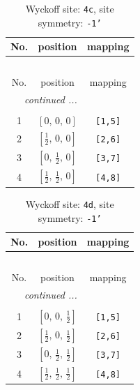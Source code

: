\documentclass[fleqn,8pt]{jsarticle}
\begin{document}
\renewcommand{\arraystretch}{1.2}
\begin{longtable}{ccc}
\caption{Wyckoff site: {\tt 4c}, site symmetry: {\tt -1'}}
 \\
 \hline \hline
No. & position & mapping \\ \hline \endfirsthead

\multicolumn{2}{l}{\tablename\ \thetable{}} \\
 \hline \hline
No. & position & mapping \\ \hline \endhead

 \hline \hline
\multicolumn{2}{r}{\footnotesize\it continued ...} \\ \endfoot

 \hline \hline
\multicolumn{2}{r}{} \\ \endlastfoot

1 & $\left[ 0,\, 0,\, 0 \right]$ & {\tt [1,5]} \\ \hline
2 & $\left[ \frac{1}{2},\, 0,\, 0 \right]$ & {\tt [2,6]} \\ \hline
3 & $\left[ 0,\, \frac{1}{2},\, 0 \right]$ & {\tt [3,7]} \\ \hline
4 & $\left[ \frac{1}{2},\, \frac{1}{2},\, 0 \right]$ & {\tt [4,8]} \\
\end{longtable}
\renewcommand{\arraystretch}{1.2}
\begin{longtable}{ccc}
\caption{Wyckoff site: {\tt 4d}, site symmetry: {\tt -1'}}
 \\
 \hline \hline
No. & position & mapping \\ \hline \endfirsthead

\multicolumn{2}{l}{\tablename\ \thetable{}} \\
 \hline \hline
No. & position & mapping \\ \hline \endhead

 \hline \hline
\multicolumn{2}{r}{\footnotesize\it continued ...} \\ \endfoot

 \hline \hline
\multicolumn{2}{r}{} \\ \endlastfoot

1 & $\left[ 0,\, 0,\, \frac{1}{2} \right]$ & {\tt [1,5]} \\ \hline
2 & $\left[ \frac{1}{2},\, 0,\, \frac{1}{2} \right]$ & {\tt [2,6]} \\ \hline
3 & $\left[ 0,\, \frac{1}{2},\, \frac{1}{2} \right]$ & {\tt [3,7]} \\ \hline
4 & $\left[ \frac{1}{2},\, \frac{1}{2},\, \frac{1}{2} \right]$ & {\tt [4,8]} \\
\end{longtable}
\end{document}
